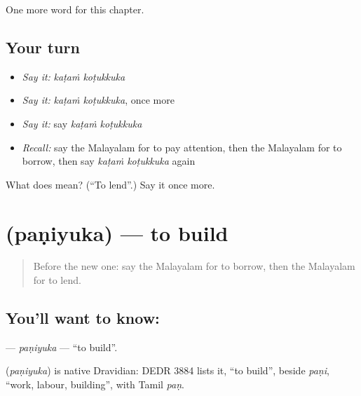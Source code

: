\begin{grammarlens}[title={What you've built}]
One more word for this chapter.
\end{grammarlens}

\subsection*{Your turn}
\begin{itemize}
\raggedright
  \item \emph{Say it:} \emph{kaṭaṁ koṭukkuka}
  \item \emph{Say it:} \emph{kaṭaṁ koṭukkuka}, once more
  \item \emph{Say it:} say \emph{kaṭaṁ koṭukkuka}
  \item \emph{Recall:} say the Malayalam for to pay attention, then the Malayalam for to borrow, then say \emph{kaṭaṁ koṭukkuka} again
\end{itemize}

\begin{tcolorbox}[breakable,colback=teal!4,colframe=teal!35!black,title={Before you move on}]
What does   mean? (\textquotedblleft{}To lend\textquotedblright{}.) Say it once more.
\end{tcolorbox}
\section[\texorpdfstring{\ml{പണിയുക} (paṇiyuka)}{പണിയുക (paṇiyuka)}]{ (paṇiyuka) — to build}

\label{lesson:ML-C271-paniyuka}



\begin{quote}
Before the new one: say the Malayalam for to borrow, then the Malayalam for to lend.
\end{quote}

\subsection*{You'll want to know: }
\textbf{} — \emph{paṇiyuka} — \textquotedblleft{}to build\textquotedblright{}.

\begin{cousinweb}
\textbf{} (\emph{paṇiyuka}) is native Dravidian: DEDR 3884 lists it, \textquotedblleft{}to build\textquotedblright{}, beside \emph{paṇi}, \textquotedblleft{}work, labour, building\textquotedblright{}, with Tamil \emph{paṇ}.
\end{cousinweb}

